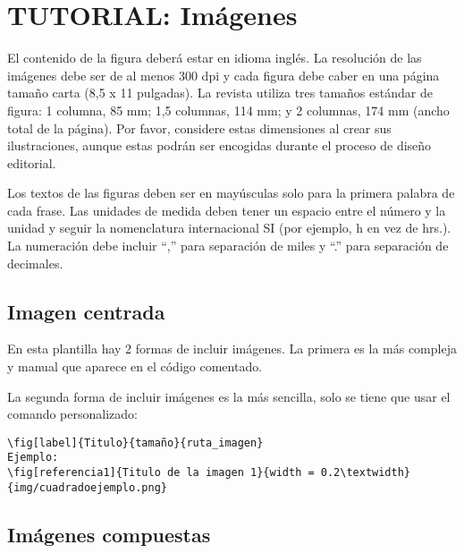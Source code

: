 \section{TUTORIAL: Imágenes}

El contenido de la figura deberá estar en idioma inglés. La resolución de las imágenes debe ser de al menos 300 dpi y cada figura debe caber en una página tamaño carta (8,5 x 11 pulgadas). La revista utiliza tres tamaños estándar de figura: 1 columna, 85 mm; 1,5 columnas, 114 mm; y 2 columnas, 174 mm (ancho total de la página). Por favor, considere estas dimensiones al crear sus ilustraciones, aunque estas podrán ser encogidas durante el proceso de diseño editorial.

Los textos de las figuras deben ser en mayúsculas solo para la primera palabra de cada frase. Las unidades de medida deben tener un espacio entre el número y la unidad y seguir la nomenclatura internacional SI (por ejemplo, h en vez de hrs.). La numeración debe incluir “,” para separación de miles y “.” para separación de decimales.


\subsection{Imagen centrada}
En esta plantilla hay 2 formas de incluir imágenes. La primera es la más compleja y manual que aparece en el código comentado.

La segunda forma de incluir imágenes es la más sencilla, solo se tiene que usar el comando personalizado:
\begin{verbatim}
\fig[label]{Titulo}{tamaño}{ruta_imagen}
Ejemplo:
\fig[referencia1]{Titulo de la imagen 1}{width = 0.2\textwidth}{img/cuadradoejemplo.png}
\end{verbatim}



\subsection{Imágenes compuestas}

